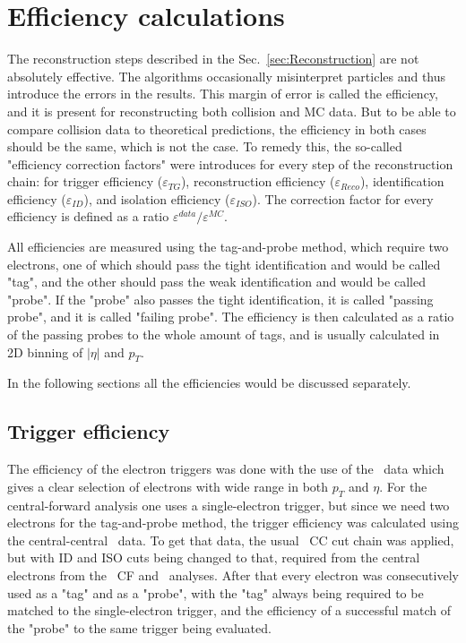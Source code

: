 \chapter{Efficiency calculations}
\label{sec:Efficiency}

The reconstruction steps described in the Sec.~\ref{sec:Reconstruction} are not absolutely effective. The algorithms occasionally misinterpret particles and thus introduce the errors in the results. This margin of error is called the efficiency, and it is present for reconstructing both collision and MC data. But to be able to compare collision data to theoretical predictions, the efficiency in both cases should be the same, which is not the case. To remedy this, the so-called "efficiency correction factors" were introduces for every step of the reconstruction chain: for trigger efficiency ($\varepsilon_{TG}$), reconstruction efficiency ($\varepsilon_{Reco}$), identification efficiency ($\varepsilon_{ID}$), and isolation efficiency ($\varepsilon_{ISO}$). The correction factor for every efficiency is defined as a ratio $\varepsilon^{data}/\varepsilon^{MC}$.

All efficiencies are measured using the tag-and-probe method, which require two electrons, one of which should pass the tight identification and would be called "tag", and the other should pass the weak identification and would be called "probe". If the "probe" also passes the tight identification, it is called "passing probe", and it is called "failing probe". The efficiency is then calculated as a ratio of the passing probes to the whole amount of tags, and is usually calculated in 2D binning of $|\eta|$ and $p_{T}$.

In the following sections all the efficiencies would be discussed separately.

\section{Trigger efficiency}

The efficiency of the electron triggers was done with the use of the \Zee\ data which gives a clear selection of electrons with wide range in both $p_{T}$ and $\eta$. For the central-forward analysis one uses a single-electron trigger, but since we need two electrons for the tag-and-probe method, the trigger efficiency was calculated using the central-central \Zee\ data. To get that data, the usual \Zee\ CC cut chain was applied, but with ID and ISO cuts being changed to that, required from the central electrons from the \Zee\ CF and \Wenu\ analyses. After that every electron was consecutively used as a "tag" and as a "probe", with the "tag" always being required to be matched to the single-electron trigger, and the efficiency of a successful match of the "probe" to the same trigger being evaluated.

